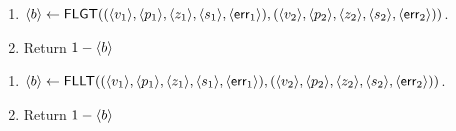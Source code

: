 \begin{enumerate}
\item $\langle b \rangle \leftarrow \mathsf{FLGT}(
        (\langle v_1 \rangle,\langle p_1 \rangle,\langle z_1 \rangle,\langle s_1 \rangle,\langle \mathsf{err}_1 \rangle),
        (\langle v_2 \rangle,\langle p_2 \rangle,\langle z_2 \rangle,\langle s_2 \rangle,\langle \mathsf{err}_2 \rangle))$.
\item Return $1 - \langle b \rangle$%
\end{enumerate}

\begin{enumerate}
\item $\langle b \rangle \leftarrow \mathsf{FLLT}(
        (\langle v_1 \rangle,\langle p_1 \rangle,\langle z_1 \rangle,\langle s_1 \rangle,\langle \mathsf{err}_1 \rangle),
        (\langle v_2 \rangle,\langle p_2 \rangle,\langle z_2 \rangle,\langle s_2 \rangle,\langle \mathsf{err}_2 \rangle))$.
\item Return $1 - \langle b \rangle$%
\end{enumerate}


